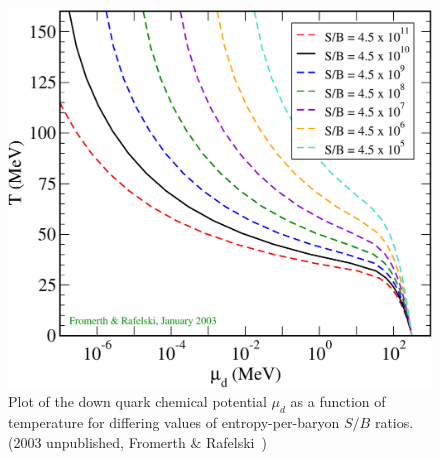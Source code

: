 \documentclass[universe,article,submit,moreauthors,pdftex,a4paper]{Definitions/mdpi}
\begin{document}
\begin{figure}[ht]
 \centering
 \includegraphics[width=\textwidth]{./plots/Tmud1.pdf}
 \caption{Plot of the down quark chemical potential $\mu_{d}$ as a function of temperature for differing values of entropy-per-baryon $S/B$ ratios. (2003 unpublished, Fromerth \& Rafelski~\cite{Rafelski:2019twp})}
 \label{QGPchem2} 
\end{figure}
\end{document}
